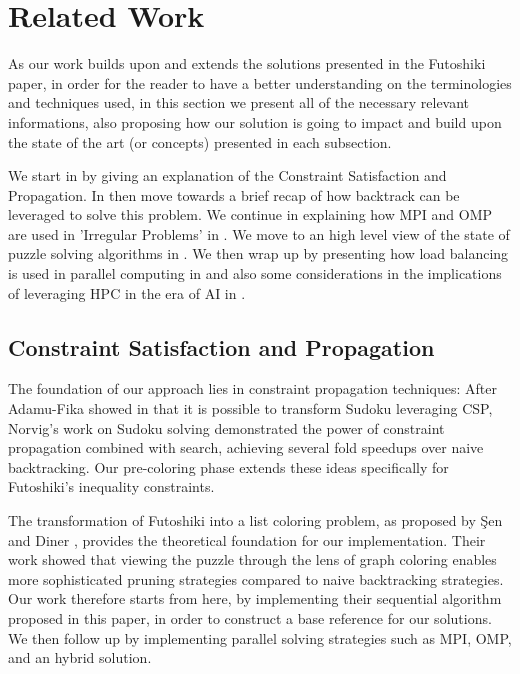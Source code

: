 \section{Related Work}
\label{sec:related_work}
As our work builds upon and extends the solutions presented in the Futoshiki paper, in order for the reader to have a better understanding on the terminologies and techniques used, in this section we present all of the necessary relevant informations, also proposing how our solution is going to impact and build upon the state of the art (or concepts) presented in each subsection. 

We start in  by giving an explanation of the Constraint Satisfaction and Propagation. In  then move towards a brief recap of how backtrack can be leveraged to solve this problem. We continue in explaining how MPI and OMP are used in 'Irregular Problems' in . We move to an high level view of the state of puzzle solving algorithms in . We then wrap up by presenting how load balancing is used in parallel computing in  and also some considerations in the implications of leveraging HPC in the era of AI in .

\subsection{Constraint Satisfaction and Propagation}
\label{subsec:csp}
The foundation of our approach lies in constraint propagation techniques: After Adamu-Fika showed in \cite{sudoku_csp} that it is possible to transform Sudoku leveraging CSP, Norvig's work on Sudoku solving \cite{NorvigSudoku} demonstrated the power of constraint propagation combined with search, achieving several fold speedups over naive backtracking. Our pre-coloring phase extends these ideas specifically for Futoshiki's inequality constraints.

The transformation of Futoshiki into a list coloring problem, as proposed by Şen and Diner \cite{Sen2024Futoshiki}, provides the theoretical foundation for our implementation. Their work showed that viewing the puzzle through the lens of graph coloring enables more sophisticated pruning strategies compared to naive backtracking strategies. Our work therefore starts from here, by implementing their sequential algorithm proposed in this paper, in order to construct a base reference for our solutions. We then follow up by implementing parallel solving strategies such as MPI, OMP, and an hybrid solution.


